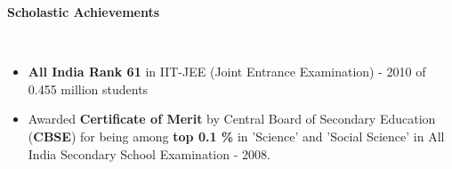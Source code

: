 \documentclass[a4paper,11pt]{article}
\newcommand{\lsep}{-0.5cm}
\newcommand{\resheading}[1]{{\small \colorbox{mygrey}{\begin{minipage}{0.975\textwidth}{\textbf{#1 \vphantom{p\^{E}}}}\end{minipage}}}}
\begin{document}
\resheading{\textbf{\large Scholastic Achievements}}\\[\lsep]
\begin{itemize}
  \item \textbf{All India Rank 61} in IIT-JEE (Joint Entrance Examination) - 2010 of 0.455 million students\\[-0.7cm]


  \item Awarded \textbf{Certificate of Merit} by Central Board of Secondary Education (\textbf{CBSE}) for being among \textbf{top 0.1 \%} in 'Science' and 'Social Science' in All India Secondary School Examination - 2008. \\[-0.7cm]


\end{itemize}
\end{document}
